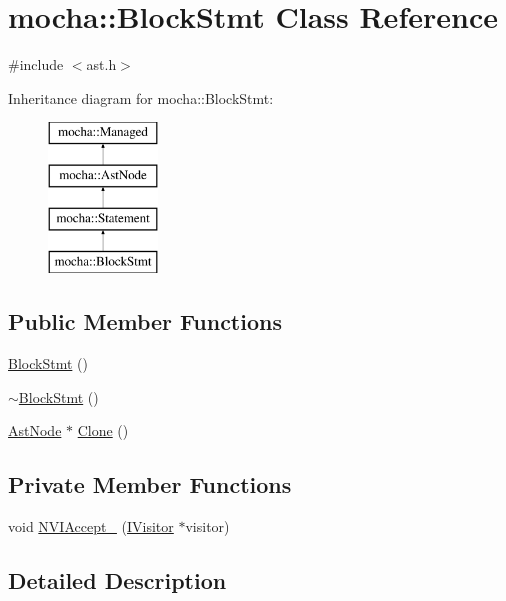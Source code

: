 \hypertarget{classmocha_1_1_block_stmt}{
\section{mocha::BlockStmt Class Reference}
\label{classmocha_1_1_block_stmt}
}


{\ttfamily \#include $<$ast.h$>$}

Inheritance diagram for mocha::BlockStmt:\begin{figure}[H]
\begin{center}
\leavevmode
\includegraphics[height=4.000000cm]{classmocha_1_1_block_stmt}
\end{center}
\end{figure}
\subsection*{Public Member Functions}
\begin{DoxyCompactItemize}
\item 
\hyperlink{classmocha_1_1_block_stmt_a4d020c3d77730d50d31f60e6a522ce74}{BlockStmt} ()
\item 
\hyperlink{classmocha_1_1_block_stmt_a39b3156ee69795a3ad60f9da6395e56d}{$\sim$BlockStmt} ()
\item 
\hyperlink{classmocha_1_1_ast_node}{AstNode} $\ast$ \hyperlink{classmocha_1_1_block_stmt_abdf13dffed90bf114e37978e11bc553b}{Clone} ()
\end{DoxyCompactItemize}
\subsection*{Private Member Functions}
\begin{DoxyCompactItemize}
\item 
void \hyperlink{classmocha_1_1_block_stmt_ade660294b70c686c3c7b1cd07dce97ab}{NVIAccept\_\-} (\hyperlink{classmocha_1_1_i_visitor}{IVisitor} $\ast$visitor)
\end{DoxyCompactItemize}


\subsection{Detailed Description}


